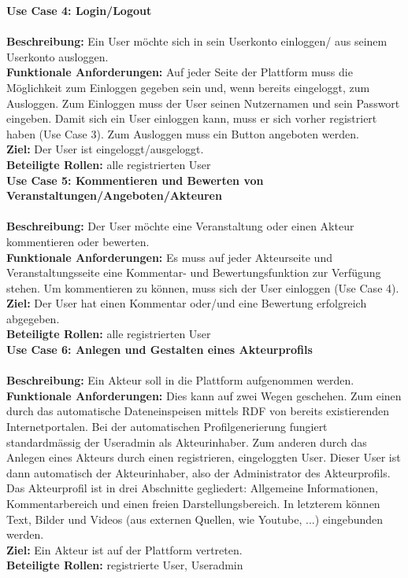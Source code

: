\documentclass{swp}
\begin{document}
\textbf{Use Case 4: Login/Logout}\\\\
\textbf{Beschreibung: }Ein User m\"ochte sich in sein Userkonto einloggen/ aus seinem Userkonto ausloggen.\\
\textbf{Funktionale Anforderungen: }Auf jeder Seite der Plattform muss die M\"oglichkeit zum Einloggen gegeben sein und, wenn bereits eingeloggt, zum Ausloggen. Zum Einloggen muss der User seinen Nutzernamen und sein Passwort eingeben. Damit sich ein User einloggen kann, muss er sich vorher registriert haben (Use Case 3). Zum Ausloggen muss ein Button angeboten werden.\\
\textbf{Ziel: }Der User ist eingeloggt/ausgeloggt.\\
\textbf{Beteiligte Rollen: }alle registrierten User\\

\textbf{Use Case 5: Kommentieren und Bewerten von Veranstaltungen/Angeboten/Akteuren}\\\\
\textbf{Beschreibung: }Der User m\"ochte eine Veranstaltung oder einen Akteur kommentieren oder bewerten.\\
\textbf{Funktionale Anforderungen: }Es muss auf jeder Akteurseite und Veranstaltungsseite eine Kommentar- und Bewertungsfunktion zur Verf\"ugung stehen. Um kommentieren zu k\"onnen, muss sich der User einloggen (Use Case 4).\\
\textbf{Ziel: }Der User hat einen Kommentar oder/und eine Bewertung erfolgreich abgegeben.\\
\textbf{Beteiligte Rollen: }alle registrierten User\\

\textbf{Use Case 6: Anlegen und Gestalten eines Akteurprofils}\\\\
\textbf{Beschreibung: }Ein Akteur soll in die Plattform aufgenommen werden.\\
\textbf{Funktionale Anforderungen: }Dies kann auf zwei Wegen geschehen. Zum einen durch das automatische Dateneinspeisen mittels RDF von bereits existierenden Internetportalen. Bei der automatischen Profilgenerierung fungiert standardm\"a{ss}ig der Useradmin als Akteurinhaber. Zum anderen durch das Anlegen eines Akteurs durch einen registrieren, eingeloggten User. Dieser User ist dann automatisch der Akteurinhaber, also der Administrator des Akteurprofils. Das Akteurprofil ist in drei Abschnitte gegliedert: Allgemeine Informationen, Kommentarbereich und einen freien Darstellungsbereich. In letzterem k\"onnen Text, Bilder und Videos (aus externen Quellen, wie Youtube, ...) eingebunden werden.\\
\textbf{Ziel: }Ein Akteur ist auf der Plattform vertreten.\\
\textbf{Beteiligte Rollen: }registrierte User, Useradmin\\
\end{document}
